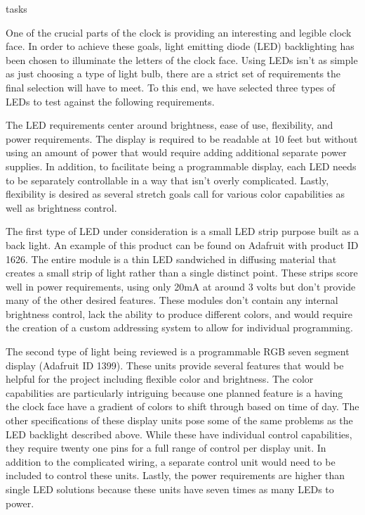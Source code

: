 tasks\documentclass[onecolumn, draftclsnofoot,10pt, compsoc]{IEEEtran}
\begin{document}
One of the crucial parts of the clock is providing an interesting and legible clock face.
In order to achieve these goals, light emitting diode (LED) backlighting has been chosen to illuminate the letters of the clock face.
Using LEDs isn’t as simple as just choosing a type of light bulb, there are a strict set of requirements the final selection will have to meet.
To this end, we have selected three types of LEDs to test against the following requirements.

The LED requirements center around brightness, ease of use, flexibility, and power requirements.
The display is required to be readable at 10 feet but without using an amount of power that would require adding additional separate power supplies.
In addition, to facilitate being a programmable display, each LED needs to be separately controllable in a way that isn’t overly complicated.
Lastly, flexibility is desired as several stretch goals call for various color capabilities as well as brightness control.

The first type of LED under consideration is a small LED strip purpose built as a back light.
An example of this product can be found on Adafruit with product ID 1626. \cite{led1}
The entire module is a thin LED sandwiched in diffusing material that creates a small strip of light rather than a single distinct point.
These strips score well in power requirements, using only 20mA at around 3 volts but don’t provide many of the other desired features.
These modules don’t contain any internal brightness control, lack the ability to produce different colors, and would require the creation of a custom addressing system to allow for individual programming.

The second type of light being reviewed is a programmable RGB seven segment display (Adafruit ID 1399). \cite{led2}
These units provide several features that would be helpful for the project including flexible color and brightness.
The color capabilities are particularly intriguing because one planned feature is a having the clock face have a gradient of colors to shift through based on time of day.
The other specifications of these display units pose some of the same problems as the LED backlight described above.
While these have individual control capabilities, they require twenty one pins for a full range of control per display unit.
In addition to the complicated wiring, a separate control unit would need to be included to control these units.
Lastly, the power requirements are higher than single LED solutions because these units have seven times as many LEDs to power.
\end{document}
